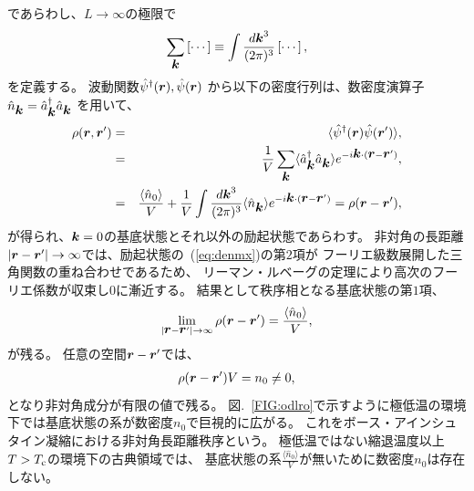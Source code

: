 \documentclass[12pt,a4paper]{jbook}
\def\Vec#1{\mbox{\boldmath $#1$}}			%
\begin{document}
        であらわし、$L \rightarrow \infty$の極限で
        \begin{eqnarray}
            \sum_{\Vec{k}} \left[ \cdots \right] \equiv \int \frac{d \Vec{k}^3}{(2\pi)^3} \left[ \cdots \right],
        \end{eqnarray}
        を定義する。
        波動関数$\hat{\psi}^\dagger(\Vec{r}),\hat{\psi}(\Vec{r})$
        から以下の密度行列は、数密度演算子
        $
            \hat{n}_{\Vec{k}} =\hat{a}^\dagger_{\Vec{k}} \hat{a}_{\Vec{k}}
        $
        を用いて、
        \begin{eqnarray}
            \rho(\Vec{r},\Vec{r}^\prime) & = & \langle \hat{\psi}^\dagger(\Vec{r}) \hat{\psi}(\Vec{r}^\prime) \rangle,
            \\
            & = & \frac{1}{V}\sum_{\Vec{k}} \langle
                \hat{a}^\dagger_{\Vec{k}} \hat{a}_{\Vec{k}}  
            \rangle
            e^{-i \Vec{k} \cdot (\Vec{r} - \Vec{r}^\prime)},
            \\
            \label{eq:denmx}
            & = & \frac{\langle \hat{n}_0 \rangle}{V} + \frac{1}{V}\int \frac{d\Vec{k}^3}{(2\pi)^3} \langle \hat{n}_{\Vec{k}} \rangle 
            e^{- i \Vec{k} \cdot (\Vec{r}-\Vec{r}^\prime)}
            = \rho(\Vec{r}-\Vec{r}^\prime),
        \end{eqnarray}
        が得られ、$\Vec{k}=0$の基底状態とそれ以外の励起状態であらわす。
        非対角の長距離$|\Vec{r}-\Vec{r}^\prime|\rightarrow \infty$では、励起状態の~(\ref{eq:denmx})の第$2$項が
        フーリエ級数展開した三角関数の重ね合わせであるため、
        リーマン・ルベーグの定理により高次のフーリエ係数が収束し$0$に漸近する。
        結果として秩序相となる基底状態の第$1$項、
        \begin{eqnarray}
            \lim_{|\Vec{r}-\Vec{r}^\prime|\rightarrow \infty} \rho(\Vec{r}-\Vec{r}^\prime) = \frac{\langle \hat{n}_0 \rangle}{V},
        \end{eqnarray}
        が残る。
        任意の空間$\Vec{r}-\Vec{r}^\prime$では、
        \begin{eqnarray}
            \rho(\Vec{r}-\Vec{r}^\prime)V = n_0 \neq 0,
        \end{eqnarray}
        となり非対角成分が有限の値で残る。
        図.~\ref{FIG:odlro}で示すように極低温の環境下では基底状態の系が数密度$n_0$で巨視的に広がる。
        これをボース・アインシュタイン凝縮における非対角長距離秩序という。
        極低温ではない縮退温度以上$T>T_{\rm c}$の環境下の古典領域では、
        基底状態の系$\frac{\langle \hat{n}_0 \rangle}{V}$が無いために数密度$n_0$は存在しない。
\end{document}
